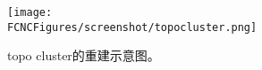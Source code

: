 \begin{figure}[H]
\centering
\texttt{[image: \\FCNCFigures/screenshot/topocluster.png]}
\caption{topo cluster的重建示意图。}
\label{fig:topocluster}
\end{figure}